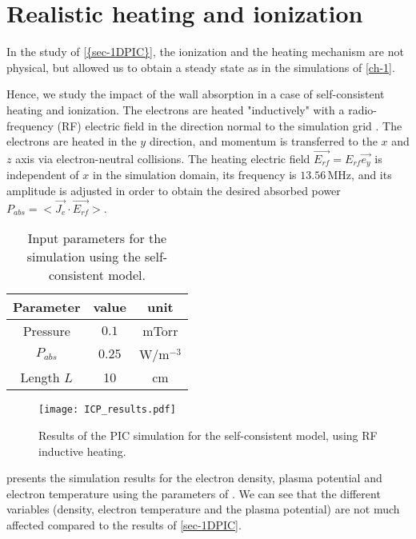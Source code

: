 
\section{Realistic heating and ionization}
  \label{sec-realistic_1D}
  In the study of \cref{{sec-1DPIC}}, the ionization and the heating mechanism are not physical, but allowed us to obtain a steady state as in the simulations of \cref{ch-1}.

  Hence, we study the impact of the wall absorption in a case of self-consistent heating and ionization.
  The electrons are heated "inductively" with a radio-frequency (RF) electric field in the direction normal to the simulation grid \cite{meige2006a, lucken2018, turner1993}.
  The electrons are heated in the $y$ direction, and momentum is transferred to the $x$ and $z$ axis via electron-neutral collisions.
  The heating electric field $\vec{E_{rf}} = E_{rf} \vec{e_y}$ is independent of $x$ in the simulation domain, its frequency is $13.56$\,MHz, and its amplitude is adjusted in order to obtain the desired absorbed power $P_{abs} = < \vec{J_e} \cdot  \vec{E_{rf}}>$.
  


  \begin{table}[!htbp]
    \centering
    \begin{tabular}{c | c | c}
      Parameter & value & unit \\ \hline
      Pressure & $0.1$ & mTorr\\
      $P_{abs}$ & $0.25$ & W/m$^{-3}$\\
      Length $L$&10&cm\\
    \end{tabular}
    \caption{Input parameters for the simulation using the self-consistent model.}
    \label{tab-PIC2}
  \end{table}

  \begin{figure}[!htbp]
    \center
    \texttt{[image: ICP\_results.pdf]}
    \caption{Results of the PIC simulation for the self-consistent model, using RF inductive heating.}
    \label{fig-icpresults}
  \end{figure}

   presents the simulation results for the electron density, plasma potential and electron temperature using the parameters of .
  We can see that the different variables (density, electron temperature and the plasma potential) are not much affected compared to the results of \cref{sec-1DPIC}.

